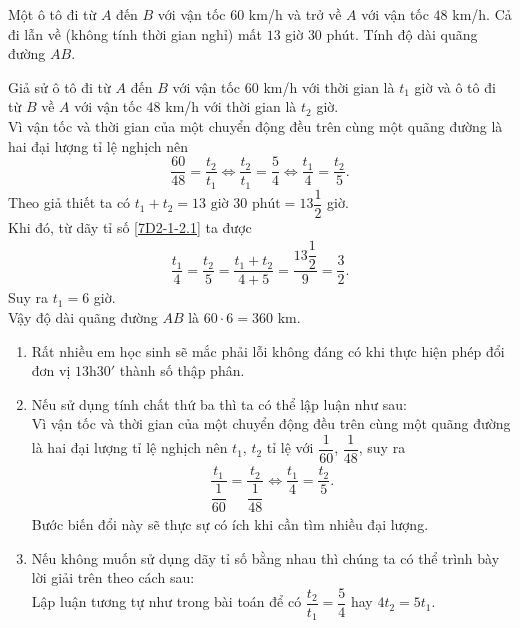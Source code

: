 \begin{vd}%
 Một ô tô đi từ $A$ đến $B$ với vận tốc $60$ km/h và trở về $A$ với vận tốc $48$ km/h. Cả đi lẫn về (không tính thời gian nghỉ) mất $13$ giờ $30$ phút. Tính độ dài quãng đường $AB$.
 \loigiai
  {
  Giả sử ô tô đi từ $A$ đến $B$ với vận tốc $60$ km/h với thời gian là $t_1$ giờ và ô tô đi từ $B$ về $A$ với vận tốc $48$ km/h với thời gian là $t_2$ giờ.\\
  Vì vận tốc và thời gian của một chuyển động đều trên cùng một quãng đường là hai đại lượng tỉ lệ nghịch nên
  \begin{equation}\label{7D2-1-2.1}
   \dfrac{60}{48} = \dfrac{t_2}{t_1} \Leftrightarrow \dfrac{t_2}{t_1}=\dfrac{5}{4} \Leftrightarrow \dfrac{t_1}{4} = \dfrac{t_2}{5}.
  \end{equation}
  Theo giả thiết ta có $t_1+t_2=13 \text{ giờ }30 \text{ phút}=13\dfrac{1}{2}$ giờ.\\
  Khi đó, từ dãy tỉ số \eqref{7D2-1-2.1} ta được
  \begin{eqnarray*}
   \dfrac{t_1}{4} = \dfrac{t_2}{5} = \dfrac{t_1+t_2}{4+5} = \dfrac{13\dfrac{1}{2}}{9} = \dfrac{3}{2}.
  \end{eqnarray*}
  Suy ra $t_1=6$ giờ.\\
  Vậy độ dài quãng đường $AB$ là $60 \cdot 6 = 360$ km.
  \begin{note}\textrm{}
   \begin{enumerate}
   	\item Rất nhiều em học sinh sẽ mắc phải lỗi không đáng có khi thực hiện phép đổi đơn vị $13\mathrm{h}30'$ thành số thập phân.
   	\item Nếu sử dụng tính chất thứ ba thì ta có thể lập luận như sau:\\
   	Vì vận tốc và thời gian của một chuyển động đều trên cùng một quãng đường là hai đại lượng tỉ lệ nghịch nên $t_1$, $t_2$ tỉ lệ với $\dfrac{1}{60}$, $\dfrac{1}{48}$, suy ra
   	\begin{eqnarray*}
   	 \dfrac{t_1}{\dfrac{1}{60}} = \dfrac{t_2}{\dfrac{1}{48}} \Leftrightarrow \dfrac{t_1}{4} = \dfrac{t_2}{5}.
   	\end{eqnarray*}
   	Bước biến đổi này sẽ thực sự có ích khi cần tìm nhiều đại lượng.
   	\item Nếu không muốn sử dụng dãy tỉ số bằng nhau thì chúng ta có thể trình bày lời giải trên theo cách sau:\\
   	Lập luận tương tự như trong bài toán để có $\dfrac{t_2}{t_1} = \dfrac{5}{4}$ hay $4t_2=5t_1$.\\

\end{enumerate}
\end{note}}
\end{vd}
